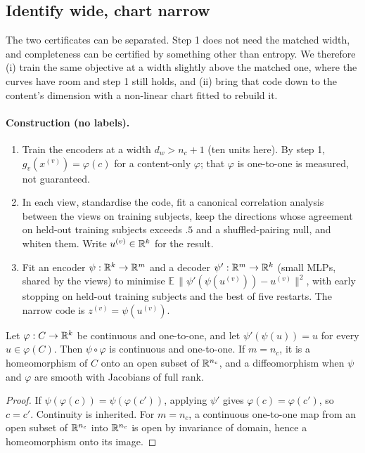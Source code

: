 \subsection{Identify wide, chart narrow}
\label{sec:theory-chart}

The two certificates can be separated. Step 1 does not need the matched width,
and completeness can be certified by something other than entropy. We
therefore (i) train the same objective at a width slightly above the matched
one, where the curves have room and step 1 still holds, and (ii) bring that code
down to the content's dimension with a non-linear chart fitted to rebuild it.

\paragraph{Construction (no labels).}
\begin{enumerate}
\item Train the encoders at a width $d_w > n_c + 1$ (ten units here). By step 1,
  $g_v(x^{(v)}) = \varphi(c)$ for a content-only $\varphi$; that $\varphi$ is
  one-to-one is measured, not guaranteed.
\item In each view, standardise the code, fit a canonical correlation analysis
  between the views on training subjects, keep the directions whose agreement
  on held-out training subjects exceeds $.5$ and a shuffled-pairing null, and
  whiten them. Write $u^{(v)} \in \mathbb{R}^{k}$ for the result.
\item Fit an encoder $\psi : \mathbb{R}^{k} \to \mathbb{R}^{m}$ and a decoder
  $\psi' : \mathbb{R}^{m} \to \mathbb{R}^{k}$ (small MLPs, shared by the views) to minimise
  $\mathbb{E}\,\lVert \psi'(\psi(u^{(v)})) - u^{(v)} \rVert^2$, with early
  stopping on held-out training subjects and the best of five restarts. The
  narrow code is $z^{(v)} = \psi(u^{(v)})$.
\end{enumerate}

\begin{proposition}[chart]
\label{prop:chart}
Let $\varphi : C \to \mathbb{R}^{k}$ be continuous and one-to-one, and let
$\psi'(\psi(u)) = u$ for every $u \in \varphi(C)$. Then $\psi \circ \varphi$ is
continuous and one-to-one. If $m = n_c$, it is a homeomorphism of $C$ onto an
open subset of $\mathbb{R}^{n_c}$, and a diffeomorphism when $\psi$ and $\varphi$ are
smooth with Jacobians of full rank.
\end{proposition}
\begin{proof}
If $\psi(\varphi(c)) = \psi(\varphi(c'))$, applying $\psi'$ gives
$\varphi(c) = \varphi(c')$, so $c = c'$. Continuity is inherited. For
$m = n_c$, a continuous one-to-one map from an open subset of $\mathbb{R}^{n_c}$ into
$\mathbb{R}^{n_c}$ is open by invariance of domain, hence a homeomorphism onto its
image.
\end{proof}

